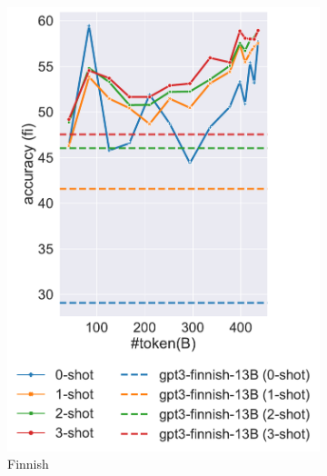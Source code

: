\begin{figure}[t]
    \centering
    \begin{subfigure}{0.2\textwidth}
        \centering
        \includegraphics[width=\textwidth]{fig/aurora-m-fi.pdf}
        \caption{Finnish}
         \label{fig:trend-fi}
    \end{subfigure}
       \hfill
    \begin{subfigure}{0.24\textwidth}
        \centering

\end{subfigure}
\end{figure}
